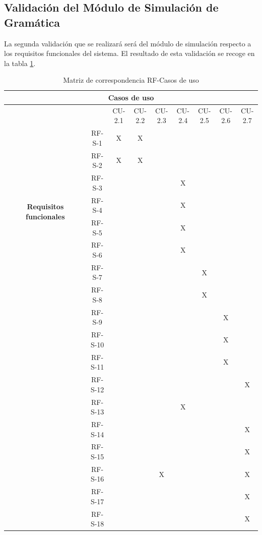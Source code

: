 \newpage

 \subsection{Validación del Módulo de Simulación de Gramática}

 La segunda validación que se realizará será del módulo de simulación respecto a los requisitos funcionales del sistema. El resultado de esta validación se recoge en la tabla \ref{val2}.

 \begin{table}[H]
 \begin{center}

  \caption{Matriz de correspondencia RF-Casos de uso}
 
 \begin{tabular}[c]{| c | c | c | c | c | c | c |c |c |}
 \hline

   \multicolumn{9}{|c|}{\textbf{Casos de uso}} \\ \hline
   \multirow{10}{0.3cm}{\begin{sideways}\textbf{Requisitos funcionales  \ \ \ \ \ \ \ \ \ \ \ \ \ \ \ }\end{sideways}} 
  
  & & CU-2.1 & CU-2.2 & CU-2.3 & CU-2.4 & CU-2.5 & CU-2.6 & CU-2.7 \\ 
  \cline{2-9}
  &RF-S-1 & X & X & & & & &    \\ 
  \cline{2-9}
  &RF-S-2 & X & X & & & & &    \\ 
  \cline{2-9}
  &RF-S-3 &  &  & &X & & &     \\ 
  \cline{2-9}
  &RF-S-4 &  &  & &X & & &    \\ 
  \cline{2-9}
  &RF-S-5 &  &  & & X& & &     \\ 
  \cline{2-9}
   &RF-S-6 &  &  & &X & & &    \\ 
  \cline{2-9}
   &RF-S-7  &  &  & & & X& &    \\ 
  \cline{2-9}
   &RF-S-8  &  &  & & &X & &    \\ 
  \cline{2-9}
   &RF-S-9 &  &  & & & &X &    \\ 
  \cline{2-9}
   &RF-S-10 &  &  & & & &X &    \\ 
  \cline{2-9}
   &RF-S-11 &  &  & & & &X &     \\ 
  \cline{2-9}
   &RF-S-12 &  &  & & & & &X   \\ 
  \cline{2-9}
   &RF-S-13 &  &  & &X & & &    \\ 
  \cline{2-9}
   &RF-S-14 &  &  & & & & &X    \\ 
  \cline{2-9}
   &RF-S-15 &  &  & & & & & X   \\
   \cline{2-9}
   &RF-S-16 &  &  & X& & & &X    \\ 
   \cline{2-9}
   &RF-S-17 &  &  & & & & &X    \\ 
  \cline{2-9}
   &RF-S-18 &  &  & & & & & X   \\ \hline
 \end{tabular}
  \label{val2}
  \end{center}
 \end{table}



